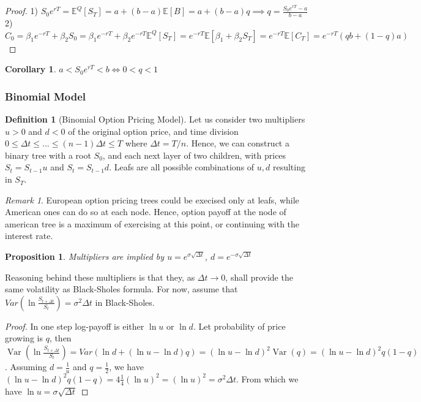 \documentclass[11pt,a4paper]{article}
\theoremstyle{plain}
\newtheorem{proposition}[theorem]{Proposition}
\newtheorem{corollary}[theorem]{Corollary}
\theoremstyle{definition}
\newtheorem{definition}[theorem]{Definition}
\theoremstyle{remark}
\newtheorem*{remark}{Remark}
\newcommand{\1}{\mathbf{1}}
\newcommand{\Var}{\operatorname{Var}}
\begin{document}
\begin{proof}
  1) $S_0e^{rT}=\mathbb{E}^Q[S_T]=a+(b-a)\mathbb{E}[B]=a+(b-a)q\implies q=\frac{S_0e^{rT}-a}{b-a}$\\
  2) $C_0=\beta_1e^{-rT}+\beta_2S_0=\beta_1e^{-rT}+\beta_2e^{-rT}\mathbb{E}^Q[S_T]=e^{-rT}\mathbb{E}[\beta_1+\beta_2S_T]=e^{-rT}\mathbb{E}[C_T]=e^{-rT}(qb+(1-q)a)$
\end{proof}

\begin{corollary}
  $a<S_0e^{rT}<b\iff0<q<1$
\end{corollary}

\subsubsection{Binomial Model}

\begin{definition}[Binomial Option Pricing Model]
  Let us consider two multipliers $u>0$ and $d<0$ of the original option price,
  and time division $0\le\Delta t\le...\le(n-1)\Delta t\le T$ where $\Delta t=T/n$.
  Hence, we can construct a binary tree with a root $S_0$, and each next layer of two children, with prices $S_t=S_{t-1}u$ and $S_t=S_{t-1}d$.
  Leafs are all possible combinations of $u,d$ resulting in $S_T$.
\end{definition}

\begin{remark}
  European option pricing trees could be execised only at leafs, while American ones can do so at each node.
  Hence, option payoff at the node of american tree is a maximum of exercising at this point, or continuing with the interest rate.
\end{remark}

\begin{proposition}
  Multipliers are implied by $u=e^{\sigma\sqrt{\Delta t}}$, $d=e^{-\sigma\sqrt{\Delta t}}$
\end{proposition}

Reasoning behind these multipliers is that they, as $\Delta t\rightarrow0$, shall provide the same volatility as Black-Sholes formula.
For now, assume that $Var(\ln\frac{S_{t+\Delta t}}{S_t})=\sigma^2\Delta t$ in Black-Sholes.

\begin{proof}
  In one step log-payoff is either $\ln u$ or $\ln d$. Let probability of price growing is $q$,
  then $\Var(\ln\frac{S_{t+\Delta t}}{S_t})=Var(\ln{d}+(\ln{u}-\ln{d})q)=(\ln{u}-\ln{d})^2\Var(q)=(\ln{u}-\ln{d})^2q(1-q)$.
  Assuming $d=\frac{1}{u}$ and $q=\frac{1}{2}$, we have $(\ln{u}-\ln{d})^2q(1-q)=4\frac{1}{4}(\ln{u})^2=(\ln{u})^2=\sigma^2\Delta t$.
  From which we have $\ln{u}=\sigma\sqrt{\Delta t}$
\end{proof}
\end{document}
